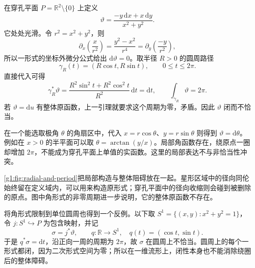 \begin{example}
	\label{g1:exm:angular-period}
	在穿孔平面 \(P=\mathbb R^2\setminus\{0\}\) 上定义
	\[
		\vartheta=\frac{-y\,\mathrm{d}x+x\,\mathrm{d}y}{x^2+y^2}.
	\]
	它处处光滑。令 \(r^2=x^2+y^2\)，则
	\[
		\partial_x\left(\frac{x}{r^2}\right)
		=\frac{y^2-x^2}{r^4}
		=\partial_y\left(\frac{-y}{r^2}\right),
	\]
	所以一形式的坐标外微分公式给出 \(\mathrm{d}\vartheta=0\)。取半径 \(R>0\) 的圆周路径
	\[
		\gamma_R(t)=(R\cos t,R\sin t),\qquad 0\le t\le2\pi.
	\]
	直接代入可得
	\[
		\gamma_R^*\vartheta
		=\frac{R^2\sin^2t+R^2\cos^2t}{R^2}\,\mathrm{d}t
		=\mathrm{d}t,\qquad
		\int_{\gamma_R}\vartheta=2\pi.
	\]
	若 \(\vartheta=\mathrm{d}u\) 有整体原函数，上一引理就要求这个周期为零，矛盾。因此 \(\vartheta\) 闭而不恰当。

	在一个能选取极角 \(\theta\) 的角扇区中，代入 \(x=r\cos\theta\)、\(y=r\sin\theta\) 则得到 \(\vartheta=\mathrm{d}\theta\)。例如在 \(x>0\) 的半平面可以取 \(\theta=\arctan(y/x)\)。局部角函数存在，绕原点一圈却增加 \(2\pi\)，不能成为穿孔平面上单值的实函数。这里的局部表达不与非恰当性冲突。
\end{example}



\cref{g1:fig:radial-and-period}把局部构造与整体阻碍放在一起。星形区域中的径向同伦始终留在定义域内，可以用来构造原形式；穿孔平面中的径向收缩则会碰到被删除的原点。图中角形式的非零周期进一步说明，它的整体原函数不存在。

\ProseParagraphBreak

将角形式限制到单位圆周也得到一个反例。以下取 \(S^1=\{(x,y):x^2+y^2=1\}\)，令 \(j:S^1\hookrightarrow P\) 为包含映射，并记
\[
	\sigma=j^*\vartheta,\qquad
	q:\mathbb R\longrightarrow S^1,\quad q(t)=(\cos t,\sin t).
\]
于是 \(q^*\sigma=\mathrm{d}t\)，沿正向一周的周期为 \(2\pi\)，故 \(\sigma\) 在圆周上不恰当。圆周上的每个一形式都闭，因为二次形式空间为零；所以在一维流形上，闭性本身也不能消除绕圈后的整体障碍。

